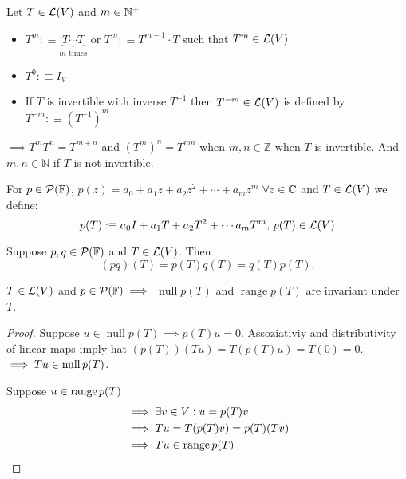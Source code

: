 \setcounter{thm}{12}
\begin{mydef}
  Let $T \in \mathcal{L}(V)$ and $m\in \mathbb{N}^{+}$
  \begin{itemize}
    \item $T^{m} :\equiv \underbrace{T \cdots T}_{\text{$m$ times}}$ or $T^{m} :\equiv T^{m-1} \cdot T$ such that $T^{m} \in \mathcal{L}(V)$
    \item $T^0 :\equiv I_V$
    \item If $T$ is invertible with inverse $T^{-1}$ then $T^{-m}\in \mathcal{L}(V)$ is defined by $T^{-m} :\equiv (T^{-1})^m$
  \end{itemize}
\end{mydef}
$\implies T^m T^n = T^{m+n}$ and $(T^m)^n=T^{mn}$ when $m,n \in \mathbb{Z}$ when $T$ is invertible. And $m,n \in \mathbb{N}$ if $T$ is not invertible.

\begin{mydef}
  For $p \in \mathcal{P} (\mathbb{F})$, $p(z) = a_0+a_1z+a_2z^2+\cdots+a_mz^m$
  $\forall z \in \mathbb{C}$ and
  $T \in \mathcal{L} (V)$ we define: \\
  \begin{equation}
    p(T) :\equiv a_0 I + a_1 T + a_2 T^2 + \cdots a_m T^m,$ $p(T) \in \linmap(V)
  \end{equation}
\end{mydef}



\setcounter{thm}{16}
\begin{thm}
  \label{multiplicative-properties}
  Suppose $p,q \in \mathcal{P} (\mathbb{F})$ and $T\in \mathcal{L} (V)$. Then \begin{equation}
    (p q)(T) = p(T) q(T) = q(T)p(T).
  \end{equation}
\end{thm}

\begin{thm}
  \label{null-space-and-range-of-p(T)-are-invariant-under-T}
  $T \in \mathcal{L}(V)$ and $p\in \mathcal{P} (\mathbb{F}) \implies$
  $\operatorname{null} p(T)$ and $\operatorname{range} p(T)$ are invariant under $T$.
\end{thm}
\begin{proof}
  Suppose $u\in \operatorname{null} p(T) \implies p(T)u = 0$. Assoziativiy and distributivity of linear maps imply hat $(p(T))(Tu)=T(p(T)u)=T(0)=0$.$\implies Tu \in \operatorname{null} p(T)$.

  Suppose $u \in \operatorname{range} p(T)$
  \begin{equation}
    \begin{aligned}
    &\implies \exists v\in V: u=p(T)v \\
    &\implies Tu=T(p(T)v)=p(T)(Tv) \\
    &\implies Tu \in \operatorname{range} p(T)
    \end{aligned}
  \end{equation}
\end{proof}

